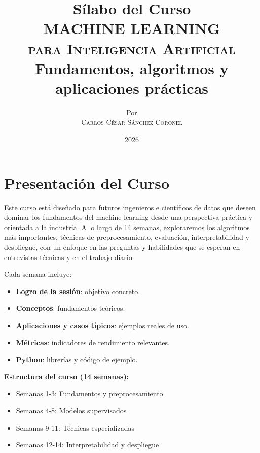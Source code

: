 \documentclass[12pt,a4paper,openany,oneside]{book}
\title{
    \textbf{Sílabo del Curso} \\ 
    \Huge \textbf{MACHINE LEARNING} \\
    \Large \textsc{para Inteligencia Artificial} \\[1cm]
    \normalsize Fundamentos, algoritmos y aplicaciones prácticas
}
\author{
    \small Por \\ \vspace{0.2cm}
    \Large \textsc{Carlos César Sánchez Coronel}
}
\date{2026}
\begin{document}
\maketitle
\tableofcontents

\chapter*{Presentación del Curso}

Este curso está diseñado para futuros ingenieros e científicos de datos que deseen dominar los fundamentos del machine learning desde una perspectiva práctica y orientada a la industria. A lo largo de 14 semanas, exploraremos los algoritmos más importantes, técnicas de preprocesamiento, evaluación, interpretabilidad y despliegue, con un enfoque en las preguntas y habilidades que se esperan en entrevistas técnicas y en el trabajo diario.

Cada semana incluye:
\begin{itemize}
    \item \textbf{Logro de la sesión}: objetivo concreto.
    \item \textbf{Conceptos}: fundamentos teóricos.
    \item \textbf{Aplicaciones y casos típicos}: ejemplos reales de uso.
    \item \textbf{Métricas}: indicadores de rendimiento relevantes.
    \item \textbf{Python}: librerías y código de ejemplo.
\end{itemize}

\vspace{0.5cm}
\textbf{Estructura del curso (14 semanas):}
\begin{itemize}
    \item[$\square$] Semanas 1-3: Fundamentos y preprocesamiento
    \item[$\square$] Semanas 4-8: Modelos supervisados
    \item[$\square$] Semanas 9-11: Técnicas especializadas
    \item[$\square$] Semanas 12-14: Interpretabilidad y despliegue
\end{itemize}

\end{document}
